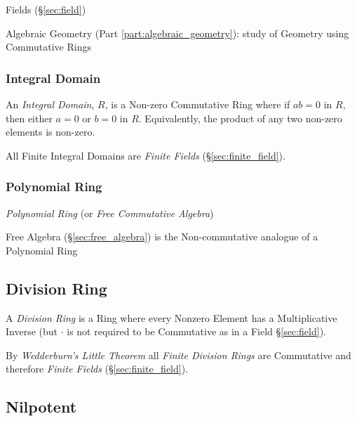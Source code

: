 Fields (\S\ref{sec:field})

Algebraic Geometry (Part \ref{part:algebraic_geometry}): study of
Geometry using Commutative Rings



\subsubsection{Integral Domain}\label{sec:integral_domain}

An \emph{Integral Domain}, $R$, is a Non-zero Commutative Ring where
if $ab = 0$ in $R$, then either $a = 0$ or $b = 0$ in $R$.
Equivalently, the product of any two non-zero elements is non-zero.

All Finite Integral Domains are \emph{Finite Fields}
(\S\ref{sec:finite_field}).



\subsubsection{Polynomial Ring}\label{sec:polynomial_ring}

\emph{Polynomial Ring} (or \emph{Free Commutative Algebra})

Free Algebra (\S\ref{sec:free_algebra}) is the Non-commutative
analogue of a Polynomial Ring



\subsection{Division Ring}\label{sec:division_ring}

A \emph{Division Ring} is a Ring where every Nonzero Element has a
Multiplicative Inverse (but $\cdot$ is not required to be Commutative
as in a Field \S\ref{sec:field}).


By \emph{Wedderburn's Little Theorem} all \emph{Finite Division Rings}
are Commutative and therefore \emph{Finite Fields}
(\S\ref{sec:finite_field}).



\subsection{Nilpotent}\label{sec:nilpotent}

